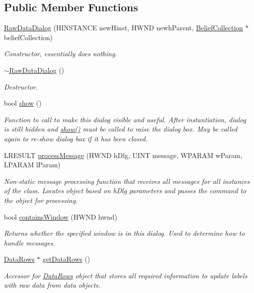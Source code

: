 \subsection*{Public Member Functions}
\begin{DoxyCompactItemize}
\item 
\hyperlink{class_raw_data_dialog_aa2c8040198fc5b94e6221295ce4b0652}{RawDataDialog} (HINSTANCE newHinst, HWND newhParent, \hyperlink{class_belief_collection}{BeliefCollection} $\ast$beliefCollection)
\begin{DoxyCompactList}\small\item\em Constructor, essentially does nothing. \end{DoxyCompactList}\item 
\hypertarget{class_raw_data_dialog_a2d30841a65fb054dc32aef2ca3b16ce6}{
\hyperlink{class_raw_data_dialog_a2d30841a65fb054dc32aef2ca3b16ce6}{$\sim$RawDataDialog} ()}
\label{class_raw_data_dialog_a2d30841a65fb054dc32aef2ca3b16ce6}

\begin{DoxyCompactList}\small\item\em Destructor. \end{DoxyCompactList}\item 
bool \hyperlink{class_raw_data_dialog_ab7a8dfabd539dc198f2ea97aec3c0b9c}{show} ()
\begin{DoxyCompactList}\small\item\em Function to call to make this dialog visible and useful. After instantiation, dialog is still hidden and \hyperlink{class_raw_data_dialog_ab7a8dfabd539dc198f2ea97aec3c0b9c}{show()} must be called to raise the dialog box. May be called again to re-\/show dialog box if it has been closed. \end{DoxyCompactList}\item 
LRESULT \hyperlink{class_raw_data_dialog_a7a2e12f99118f2ba69bee51c07e04631}{processMessage} (HWND hDlg, UINT message, WPARAM wParam, LPARAM lParam)
\begin{DoxyCompactList}\small\item\em Non-\/static message processing function that receives all messages for all instances of the class. Locates object based on hDlg parameters and passes the command to the object for processing. \end{DoxyCompactList}\item 
bool \hyperlink{class_raw_data_dialog_ab118e3a9b3e53a9ddf48f0876e1a7be3}{containsWindow} (HWND hwnd)
\begin{DoxyCompactList}\small\item\em Returns whether the specified window is in this dialog. Used to determine how to handle messages. \end{DoxyCompactList}\item 
\hyperlink{struct_data_rows}{DataRows} $\ast$ \hyperlink{class_raw_data_dialog_ac9bc6efc5251ffad3179f0a912eb9042}{getDataRows} ()
\begin{DoxyCompactList}\small\item\em Accessor for \hyperlink{struct_data_rows}{DataRows} object that stores all required information to update labels with raw data from data objects. \end{DoxyCompactList}\end{DoxyCompactItemize}
